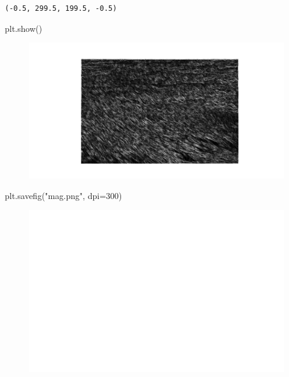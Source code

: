 \documentclass[
  letterpaper,
  DIV=11,
  numbers=noendperiod]{scrreprt}
\newenvironment{Shaded}{\begin{snugshade}}{\end{snugshade}}
\newcommand{\DecValTok}[1]{\textcolor[rgb]{0.68,0.00,0.00}{#1}}
\newcommand{\NormalTok}[1]{\textcolor[rgb]{0.00,0.23,0.31}{#1}}
\newcommand{\OperatorTok}[1]{\textcolor[rgb]{0.37,0.37,0.37}{#1}}
\newcommand{\StringTok}[1]{\textcolor[rgb]{0.13,0.47,0.30}{#1}}
\begin{document}
\begin{verbatim}
(-0.5, 299.5, 199.5, -0.5)
\end{verbatim}

\begin{Shaded}
\begin{Highlighting}[]
\NormalTok{plt.show()}
\end{Highlighting}
\end{Shaded}

\begin{figure}[H]

{\centering \includegraphics{results_files/figure-pdf/unnamed-chunk-8-1.pdf}

}

\end{figure}

\begin{Shaded}
\begin{Highlighting}[]

\NormalTok{plt.savefig(}\StringTok{"mag.png"}\NormalTok{, dpi}\OperatorTok{=}\DecValTok{300}\NormalTok{)}
\end{Highlighting}
\end{Shaded}

\begin{figure}[H]

{\centering \includegraphics{results_files/figure-pdf/unnamed-chunk-8-2.pdf}

}

\end{figure}
\end{document}
